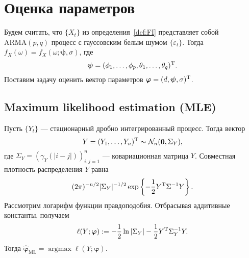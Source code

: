 \documentclass[specialist,
substylefile = spbu_report.rtx,
subf,href,colorlinks=true, 12pt]{disser}
\theoremstyle{definition}
\begin{document}
\section{Оценка параметров}
Будем считать, что $\{X_t\}$ из определения~\ref{def:FI}  представляет собой $\mathrm{ARMA}(p, q)$ процесс с гауссовским белым шумом $\{\varepsilon_t\}$.  Тогда $f_X(\omega)=f_X(\omega; \boldsymbol{\psi}, \sigma)$, где
$$\boldsymbol{\psi}=(\phi_1,\ldots,\phi_p,\theta_1,\ldots,\theta_q)^{\mathrm{T}}.$$ Поставим задачу оценить вектор параметров $\boldsymbol{\varphi}=(d, \boldsymbol{\psi}, \sigma)^{\mathrm{T}}$.

\subsection{Maximum likelihood estimation (MLE)}
Пусть $\{Y_t\}$ --- стационарный дробно интегрированный процесс. Тогда вектор
\[
	Y=(Y_1,\ldots,Y_n)^{\mathrm{T}}\sim \mathcal{N}_n(\boldsymbol{0}, \Sigma_Y),
\]
где $\Sigma_Y=(\gamma_Y(|i-j|))_{i,j=1}^n$ --- ковариационная матрица $Y$. Совместная плотность распределения $Y$ равна
\[
	(2\pi)^{-n/2}|\Sigma_Y|^{-1/2}\exp\left\{-\frac12Y^{\mathrm{T}}\Sigma^{-1}Y\right\}.
\]
Рассмотрим логарифм функции правдоподобия. Отбрасывая аддитивные константы, получаем
\[
	\ell(Y;\boldsymbol{\varphi}):=-\frac12\ln|\Sigma_Y|-\frac12 Y^{\mathrm{T}} \Sigma^{-1}_Y Y.
\]
Тогда $\widehat{\boldsymbol{\varphi}}_\mathrm{ML}=\operatorname{argmax}\ell(Y;\boldsymbol{\varphi}).$
\end{document}
